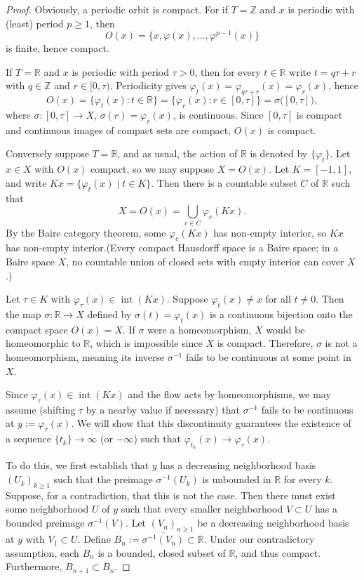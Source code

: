 \begin{proof}
    Obviously, a periodic orbit is compact.
    For if $T=\mathbb Z$ and $x$ is periodic with (least) period $p\ge1$, then
    \[
        O(x)=\{x,\varphi(x),\dots,\varphi^{p-1}(x)\}
    \]
    is finite, hence compact.

    If $T=\mathbb R$ and $x$ is periodic with period $\tau>0$, then for every $t\in\mathbb R$ write
    $t=q\tau+r$ with $q\in\mathbb Z$ and $r\in[0,\tau)$. Periodicity gives
    $\varphi_t(x)=\varphi_{q\tau+r}(x)=\varphi_r(x)$, hence
    \[
        O(x)=\{\varphi_t(x):t\in\mathbb R\}=\{\varphi_r(x):r\in[0,\tau]\}
        =\sigma\bigl([0,\tau]\bigr),
    \]
    where $\sigma:[0,\tau]\to X$, $\sigma(r)=\varphi_r(x)$, is continuous.
    Since $[0,\tau]$ is compact and continuous images of compact sets are compact,
    $O(x)$ is compact.

    Conversely suppose $T = \mathbb{R}$, and as usual, the action of $\mathbb{R}$ is denoted by $\{\varphi_t\}$. Let $x \in X$ with $O(x)$ compact, so we may suppose $X = O(x)$. Let $K = [-1,1]$, and write $Kx = \{\varphi_t(x) \mid t \in K\}$. Then there is a countable subset $C$ of $\mathbb{R}$ such that
    \[
        X = O(x) = \bigcup_{c \in C} \varphi_c(Kx).
    \]
    By the Baire category theorem, some $\varphi_c(Kx)$ has non-empty interior, so $Kx$ has non-empty interior.(Every compact Hausdorff space is a Baire space; in a Baire space $X$, no countable union of closed sets with empty interior can cover $X$.)



    Let $\tau \in K$ with $\varphi_\tau(x) \in \operatorname{int}(Kx)$. Suppose $\varphi_t(x) \ne x$ for all $t \ne 0$. Then the map $\sigma: \mathbb{R} \to X$ defined by $\sigma(t) = \varphi_t(x)$ is a continuous bijection onto the compact space $O(x) = X$. If $\sigma$ were a homeomorphism, $X$ would be homeomorphic to $\mathbb{R}$, which is impossible since $X$ is compact. Therefore, $\sigma$ is not a homeomorphism, meaning its inverse $\sigma^{-1}$ fails to be continuous at some point in $X$.

    Since $\varphi_\tau(x) \in \operatorname{int}(Kx)$ and the flow acts by homeomorphisms, we may assume (shifting $\tau$ by a nearby value if necessary) that $\sigma^{-1}$ fails to be continuous at $y := \varphi_\tau(x)$. We will show that this discontinuity guarantees the existence of a sequence $\{t_k\} \to \infty$ (or $-\infty$) such that $\varphi_{t_k}(x) \to \varphi_\tau(x)$.

    To do this, we first establish that $y$ has a decreasing neighborhood basis $(U_k)_{k \ge 1}$ such that the preimage $\sigma^{-1}(U_k)$ is unbounded in $\mathbb{R}$ for every $k$. Suppose, for a contradiction, that this is not the case. Then there must exist some neighborhood $U$ of $y$ such that every smaller neighborhood $V \subset U$ has a bounded preimage $\sigma^{-1}(V)$. Let $(V_n)_{n \ge 1}$ be a decreasing neighborhood basis at $y$ with $V_1 \subset U$. Define $B_n := \overline{\sigma^{-1}(V_n)} \subset \mathbb{R}$. Under our contradictory assumption, each $B_n$ is a bounded, closed subset of $\mathbb{R}$, and thus compact. Furthermore, $B_{n+1} \subset B_n$.


\end{proof}
